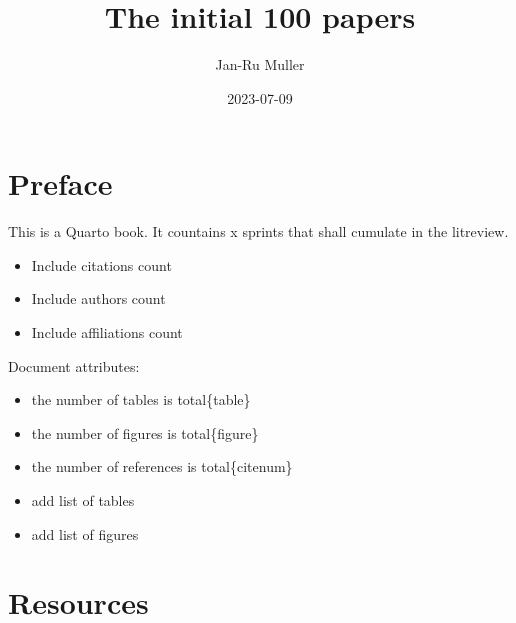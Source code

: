 \documentclass[
  letterpaper,
  DIV=11,
  numbers=noendperiod]{scrreprt}
\title{The initial 100 papers}
\author{Jan-Ru Muller}
\date{2023-07-09}
\providecommand{\tightlist}{%
  \setlength{\itemsep}{0pt}\setlength{\parskip}{0pt}}\usepackage{longtable,booktabs,array}
\renewcommand*\contentsname{Table of contents}
\newcommand\contentsname{Table of contents}
\begin{document}
\maketitle
\ifdefined\Shaded\renewenvironment{Shaded}{\begin{tcolorbox}[frame hidden, interior hidden, enhanced, borderline west={3pt}{0pt}{shadecolor}, sharp corners, boxrule=0pt, breakable]}{\end{tcolorbox}}\fi

\renewcommand*\contentsname{Table of contents}
{
\hypersetup{linkcolor=}
\setcounter{tocdepth}{2}
\tableofcontents
}

\hypertarget{preface}{%
\chapter*{Preface}\label{preface}}


This is a Quarto book. It countains x sprints that shall cumulate in the
litreview.

\begin{itemize}
\tightlist
\item
  Include citations count
\item
  Include authors count
\item
  Include affiliations count
\end{itemize}

Document attributes:

\begin{itemize}
\item
  the number of tables is total\{table\}
\item
  the number of figures is total\{figure\}
\item
  the number of references is total\{citenum\}
\item
  add list of tables
\item
  add list of figures
\end{itemize}


\hypertarget{resources}{%
\chapter*{Resources}\label{resources}}

\end{document}
